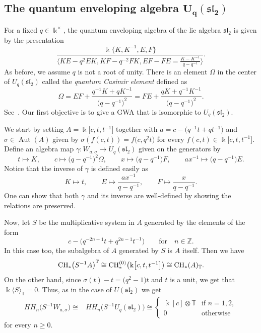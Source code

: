 \documentclass[pdftex]{sigma}
\newcommand{\G}[1]{\mathfrak{#1}}
\newcommand{\B}[1]{\mathbb{#1}}
\newcommand{\CH}{{\rm CH}}
\renewcommand{\geq}{\geqslant}
\numberwithin{equation}{section}
\begin{document}
\subsection[The quantum enveloping algebra U\_q(Gsl\_2)]{The quantum enveloping algebra $\boldsymbol{U_q(\G{sl}_2)}$}\label{sect:QuantumSL2}

For a fixed $q\in\Bbbk^\times$, the quantum enveloping algebra of the lie algebra $\G{sl}_2$
is given by the presentation
\[ \frac{\Bbbk\big\{K,K^{-1},E,F\big\}}{\big\langle KE - q^2EK, KF - q^{-2}FK,
 EF-FE=\frac{K-K^{-1}}{q-q^{-1}}\big\rangle}.
\] As before, we assume $q$ is not a root of unity. There is an element $\Omega$ in the
center of $U_q(\G{sl}_2)$ called the \emph{quantum Casimir element} defined as
\[%
 \Omega = EF + \frac{q^{-1}K + qK^{-1}}{\bigl(q-q^{-1}\bigr)^2}
 = FE + \frac{qK+q^{-1}K^{-1}}{\bigl(q-q^{-1}\bigr)^2}.
\]
See~\cite[Section~I.3]{BrownGoodearl:QuantumGroups}. Our first objective is to give a GWA that
is isomorphic to $U_q(\G{sl}_2)$.

We start by setting $A=\Bbbk\big[c,t,t^{-1}\big]$ together with
$
 a = c - \bigl(q^{-1}t+qt^{-1}\bigr)
$
and $\sigma\in \operatorname{Aut}(A)$ given by $\sigma(f(c,t)) = f\bigl(c,q^2 t\bigr)$ for every
$f(c,t)\in\Bbbk\big[c,t,t^{-1}\big]$. Define an algebra map
$\gamma\colon W_{a,\sigma}\to U_q(\G{sl}_2)$ given on the generators by
\[
 t\mapsto K, \qquad
 c\mapsto \bigl(q-q^{-1}\bigr)^2\Omega, \qquad
 x\mapsto \bigl(q-q^{-1}\bigr)F,\qquad
 ax^{-1} \mapsto \bigl(q-q^{-1}\bigr)E.
\] Notice that the inverse of $\gamma$ is defined easily as
\[ K\mapsto t, \qquad
 E\mapsto \frac{ax^{-1}}{q-q^{-1}},\qquad
 F\mapsto \frac{x}{q-q^{-1}}.
\] One can show that both $\gamma$ and its inverse are well-defined by showing the
relations are preserved.

Now, let $S$ be the multiplicative system in $A$ generated by the elements of the form
\[
 c - \bigl(q^{-2n+1}t+q^{2n-1}t^{-1}\bigr)\qquad \text{for}\quad n\in\B{Z}.
\]
In this case too, the subalgebra of $A$ generated by $S$ is $A$ itself. Then we have
\[
 \CH_*\bigl(S^{-1}A\bigr)^{\B{T}} \cong \CH_*^{(0)}\bigl(\Bbbk\big[c,t,t^{-1}\big]\bigr) \cong \CH_*(A)_{\B{T}}.
\]
On the other hand, since $\sigma(t)-t = \bigl(q^2-1\bigr)t$ and $t$ is a unit, we get that
$\Bbbk\langle S\rangle_{\B{T}} = 0$. Thus, as in the case of $U(\G{sl}_2)$ we get
\begin{align*}
 HH_n\bigl(S^{-1}W_{a,\sigma}\bigr)
 \cong & HH_n\bigl(S^{-1}U_q(\G{sl}_2)\bigr)
 \cong
 \begin{cases}
 \Bbbk[c]\otimes\B{T} & \text{if } n=1,2,\\
 0 & \text{otherwise }
 \end{cases}
\end{align*}
for every $n\geq 0$.
\end{document}

